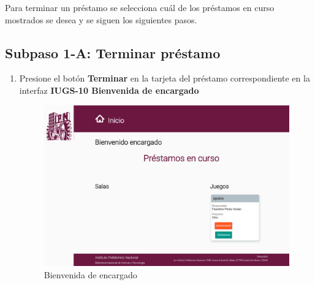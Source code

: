 Para terminar un préstamo se selecciona cuál de los préstamos en curso mostrados se desea y se siguen los siguientes pasos.
\subsection{Subpaso 1-A: Terminar préstamo}
\begin{enumerate}
	\item Presione el botón \textbf{Terminar} en la tarjeta del préstamo 
		correspondiente en la interfaz 
		\textbf{IUGS-10 Bienvenida de encargado}
		\begin{figure}[hbtp]
	\includegraphics[scale=0.3]{images/Interfaz/IUGS-10 Bienvenida de encargado.png}
	\caption{Bienvenida de encargado}
	\end{figure}
\end{enumerate}
